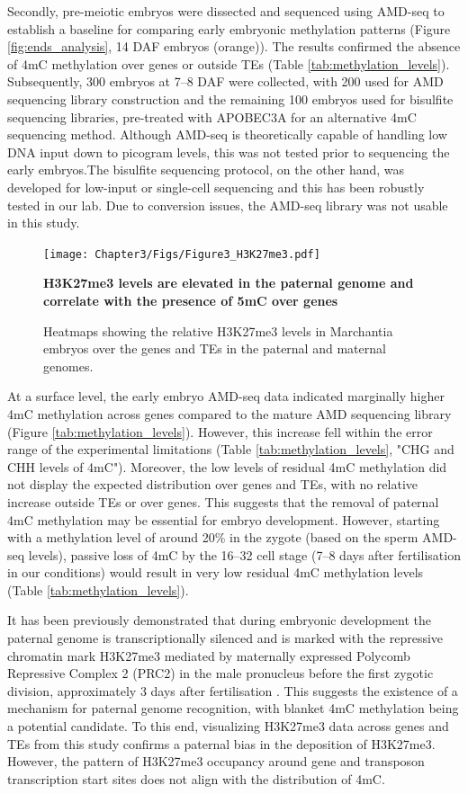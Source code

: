 Secondly, pre-meiotic embryos were dissected and sequenced using AMD-seq to establish a baseline for comparing early embryonic methylation patterns (Figure \ref{fig:ends_analysis}, 14 DAF embryos (orange)). The results confirmed the absence of 4mC methylation over genes or outside TEs (Table \ref{tab:methylation_levels}). Subsequently, 300 embryos at 7–8 DAF were collected, with 200 used for AMD sequencing library construction and the remaining 100 embryos used for bisulfite sequencing libraries, pre-treated with APOBEC3A for an alternative 4mC sequencing method. Although AMD-seq is theoretically capable of handling low DNA input down to picogram levels\citep{idtdna_methylseq_kit}, this was not tested prior to sequencing the early embryos.The bisulfite sequencing protocol, on the other hand, was developed for low-input or single-cell sequencing and this has been robustly tested in our lab. Due to conversion issues, the AMD-seq library was not usable in this study. 

\begin{figure}[htbp!] 
\centering    
    \texttt{[image: Chapter3/Figs/Figure3\_H3K27me3.pdf]}
\caption{\textbf{H3K27me3 levels are elevated in the paternal genome and correlate with the presence of 5mC over genes}}
\label{fig:h3k27me3}
\captionsetup{font=small}
    \caption*{Heatmaps showing the relative H3K27me3 levels in Marchantia embryos over the genes and TEs in the paternal and maternal genomes.}
\end{figure}

At a surface level, the early embryo AMD-seq data indicated marginally higher 4mC methylation across genes compared to the mature AMD sequencing library (Figure \ref{tab:methylation_levels}). However, this increase fell within the error range of the experimental limitations (Table \ref{tab:methylation_levels}, "CHG and CHH levels of 4mC"). Moreover, the low levels of residual 4mC methylation did not display the expected distribution over genes and TEs, with no relative increase outside TEs or over genes. This suggests that the removal of paternal 4mC methylation may be essential for embryo development. However, starting with a methylation level of around 20\% in the zygote (based on the sperm AMD-seq levels), passive loss of 4mC by the 16–32 cell stage (7–8 days after fertilisation in our conditions) would result in very low residual 4mC methylation levels (Table \ref{tab:methylation_levels}). 

It has been previously demonstrated that during embryonic development the paternal genome is transcriptionally silenced and is marked with the repressive chromatin mark H3K27me3 mediated by maternally expressed Polycomb Repressive Complex 2 (PRC2) in the male pronucleus before the first zygotic division, approximately 3 days after fertilisation \citep{RN160}. This suggests the existence of a mechanism for paternal genome recognition, with blanket 4mC methylation being a potential candidate. To this end, visualizing H3K27me3 data across genes and TEs from this study confirms a paternal bias in the deposition of H3K27me3. However, the pattern of H3K27me3 occupancy around gene and transposon transcription start sites does not align with the distribution of 4mC.

